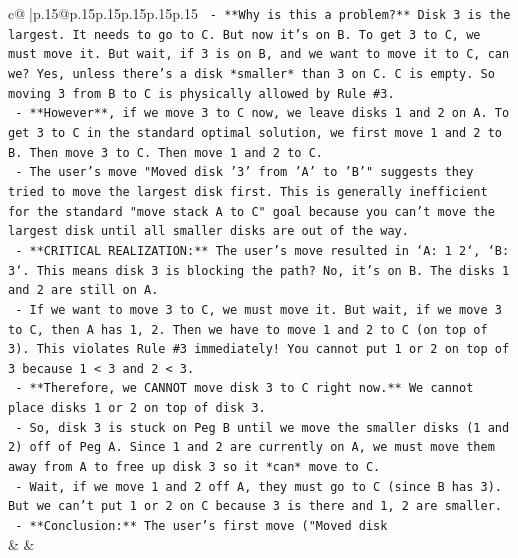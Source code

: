 \documentclass{article}
\begin{document}
{\begin{supertabular}{c@{$\;$}|p{.15\linewidth}@{}p{.15\linewidth}p{.15\linewidth}p{.15\linewidth}p{.15\linewidth}p{.15\linewidth}}
{{{\texttt{    {-} **Why is this a problem?** Disk 3 is the largest. It needs to go to C. But now it's on B. To get 3 to C, we must move it. But wait, if 3 is on B, and we want to move it to C, can we? Yes, unless there's a disk *smaller* than 3 on C. C is empty. So moving 3 from B to C is physically allowed by Rule \#3.} \\
\texttt{    {-} **However**, if we move 3 to C now, we leave disks 1 and 2 on A. To get 3 to C in the standard optimal solution, we first move 1 and 2 to B. Then move 3 to C. Then move 1 and 2 to C.} \\
\texttt{    {-} The user's move "Moved disk '3' from 'A' to 'B'" suggests they tried to move the largest disk first. This is generally inefficient for the standard "move stack A to C" goal because you can't move the largest disk until all smaller disks are out of the way.} \\
\texttt{    {-} **CRITICAL REALIZATION:** The user's move resulted in `A: 1 2`, `B: 3`. This means disk 3 is blocking the path? No, it's on B. The disks 1 and 2 are still on A.} \\
\texttt{    {-} If we want to move 3 to C, we must move it. But wait, if we move 3 to C, then A has 1, 2. Then we have to move 1 and 2 to C (on top of 3). This violates Rule \#3 immediately! You cannot put 1 or 2 on top of 3 because 1 < 3 and 2 < 3.} \\
\texttt{    {-} **Therefore, we CANNOT move disk 3 to C right now.** We cannot place disks 1 or 2 on top of disk 3.} \\
\texttt{    {-} So, disk 3 is stuck on Peg B until we move the smaller disks (1 and 2) off of Peg A. Since 1 and 2 are currently on A, we must move them away from A to free up disk 3 so it *can* move to C.} \\
\texttt{    {-} Wait, if we move 1 and 2 off A, they must go to C (since B has 3). But we can't put 1 or 2 on C because 3 is there and 1, 2 are smaller.} \\
\texttt{    {-} **Conclusion:** The user's first move ("Moved disk} \\
            }
        }
    }
    & & \\ \\


\end{supertabular}}
\end{document}
